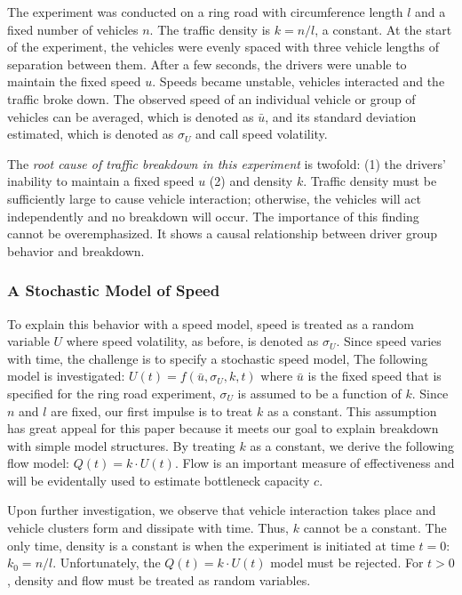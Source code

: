 \documentclass[Proceedings]{ascelike}
\begin{document}
The experiment was conducted on a ring  road with circumference length $l$ and  a fixed number of  vehicles  $n$. The traffic density is $k = n/l$, a constant. At the start of the experiment, the vehicles were evenly spaced with three vehicle lengths of separation between them. After a few seconds, the drivers were unable to maintain the fixed speed $u$. Speeds became unstable, vehicles interacted and the traffic broke down.  The observed speed of an individual vehicle or group of vehicles can be averaged, which is denoted as $\bar{u}$, and its standard deviation estimated, which is denoted as $\sigma_U$ and call speed volatility.  

The \emph{root cause of traffic breakdown in this experiment} is twofold: (1) the drivers' inability to maintain  a fixed speed $u$ (2) and density $k$. Traffic density must be sufficiently large to cause vehicle interaction; otherwise, the vehicles will act independently and no breakdown will occur. The importance of this finding cannot be overemphasized. It shows a causal relationship between driver group behavior and breakdown.

\subsubsection{A Stochastic Model of Speed}

To explain this behavior with a speed model, speed is treated as a random variable $U$ where speed volatility, as before, is denoted as $\sigma_U$.  Since speed varies with time, the challenge is  to specify a stochastic speed model, The following model is investigated: $U(t) = f(\bar{u},\sigma_U,k,t)$ where $\bar{u}$ is the fixed speed that is specified for the ring road experiment, $\sigma_U$ is assumed to be a function of $k$. Since $n$ and $l$ are fixed, our first impulse is to treat $k$ as a constant. This assumption has great appeal for this paper because it meets our goal to explain breakdown with simple model structures. By treating  $k$ as a constant,  we derive the following flow model: $Q(t) = k \cdot U(t)$. Flow is an important measure of effectiveness and will be evidentally used to estimate bottleneck capacity $c$.

Upon further investigation, we observe that vehicle interaction  takes place and vehicle clusters form and dissipate with time. Thus, $k$ cannot be a constant. The only time, density is a constant is when the experiment is initiated at time $t = 0$: $k_0 = n/l$. Unfortunately, the $Q(t) = k \cdot U(t)$ model must be rejected. For $t > 0$, density and flow must be treated as random variables. 
\end{document}
